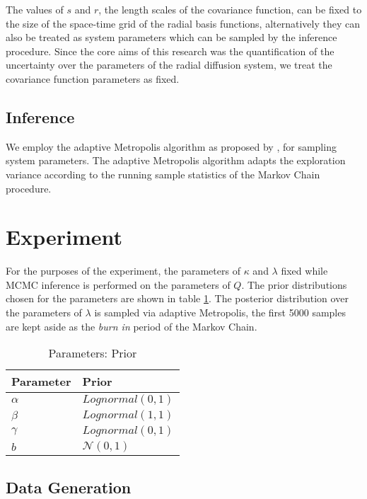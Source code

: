 The values of $s$ and $r$, the length scales of the covariance function, 
can be fixed to the size of the space-time grid of the radial basis functions, 
alternatively they can also be treated as system parameters which can be sampled 
by the inference procedure. Since the core aims of this research was the quantification
of the uncertainty over the parameters of the radial diffusion system, 
we treat the covariance function parameters as fixed.

\subsection{Inference}

We employ the adaptive Metropolis algorithm as proposed by \citet{haario2001}, for sampling
system parameters. The adaptive Metropolis algorithm adapts the exploration variance according
to the running sample statistics of the Markov Chain procedure.


\section{Experiment}\label{sec:exp}

For the purposes of the experiment, the parameters of $\kappa$ and $\lambda$ fixed while MCMC inference 
is performed on the parameters of $Q$. The prior distributions chosen for the parameters 
are shown in table \ref{tab:prior}. The posterior distribution over the parameters of $\lambda$ is 
sampled via adaptive Metropolis, the first 5000 samples are kept aside as the \emph{burn in} period
of the Markov Chain.

\begin{table}[t]
  \caption{Parameters: Prior}
  \label{tab:prior}
  \centering
  \begin{tabular}{ll}
    \toprule
    \cmidrule{1-2}
    Parameter     & Prior\\
    \midrule
    $\alpha$ & $Lognormal(0, 1)$ \\
    $\beta$  & $Lognormal(1, 1)$ \\ 
    $\gamma$ & $Lognormal(0, 1)$ \\ 
    $b$ & $\mathcal{N}(0, 1)$ \\
    \bottomrule
  \end{tabular}
\end{table}


\subsection*{Data Generation}


